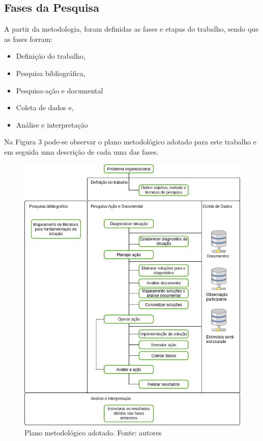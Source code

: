 \subsection{Fases da Pesquisa}

A partir da metodologia, foram definidas as fases e etapas do trabalho, sendo que as fases forram:

\begin{itemize}
	\item Definição do trabalho,
	\item Pesquisa bibliográfica,
	\item Pesquisa-ação e documental
	\item Coleta de dados e,
	\item Análise e interpretação
\end{itemize}

Na Figura 3 pode-se observar o plano metodológico adotado para este trabalho e em seguida
uma descrição de cada uma das fases.

\begin{figure}[!htb]
	\centering
	\includegraphics[scale=0.6]{figuras/Plano_metodologico}
	\caption{Plano metodológico adotado. Fonte: autores}
\end{figure}

